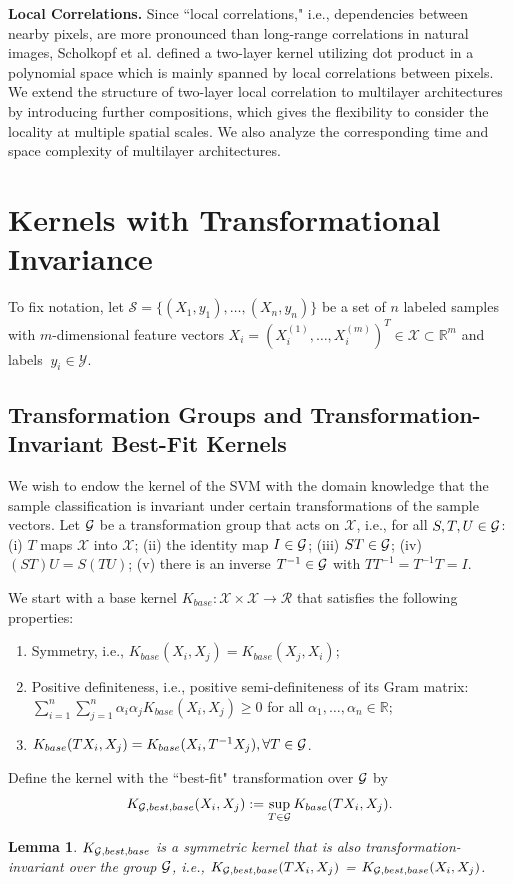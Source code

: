 \documentclass{article}
\theoremstyle{plain}
\newtheorem{lemma}{Lemma}
\theoremstyle{definition}
\theoremstyle{remark}
\begin{document}
\textbf{Local Correlations.}
Since ``local correlations," i.e., dependencies between nearby pixels, are more pronounced than long-range correlations in natural images, Scholkopf et al. \cite{scholkopf1998prior} defined a two-layer kernel utilizing dot product in a polynomial space which is mainly spanned by local correlations between pixels. We extend the structure of two-layer local correlation to multilayer architectures by introducing further compositions, which gives the flexibility to consider the locality at multiple spatial scales. We also analyze the corresponding time and space complexity of multilayer architectures. 



\section{Kernels with Transformational Invariance}
To fix notation, let  $\mathcal{S} = \{(X_1, y_1), \dots, (X_n, y_n)\}$ be a set of $n$ labeled samples with $m$-dimensional feature vectors $X_i = (X^{(1)}_i, \ldots, X^{(m)}_i)^T \in \mathcal{X} \subset \mathbb{R}^m$ and labels $\ y_i \in \mathcal{Y}$. 

\subsection{Transformation Groups and Transformation-Invariant Best-Fit Kernels} \label{sec:group-kernel}
We wish to endow the kernel of the SVM with the domain knowledge that the sample classification is invariant under certain transformations of the sample vectors. Let ${\cal{G}}$ be a transformation group that acts on $\mathcal{X}$, i.e., for all $S,T,U \in {\cal{G}}$: (i) $T$ maps $\mathcal{X}$ into $\mathcal{X}$; (ii) the identity map $I \in {\cal{G}}$; (iii) $ST \in {\cal{G}}$; (iv) $(ST)U = S(TU)$; (v) there is an inverse $T^{-1} \in {\cal{G}}$ with $T T^{-1} = T^{-1}T=I$.

We start with a base kernel $K_{base}: \mathcal{X} \times \mathcal{X} \to \mathcal{R}$ that satisfies the following properties:
\begin{enumerate}[itemsep=0mm]
\item 
Symmetry, i.e., $K_{base}(X_i,X_j)=K_{base}(X_j,X_i)$;
\item 
Positive definiteness, i.e., positive semi-definiteness of its Gram matrix: $\sum_{i=1}^n \sum_{j=1}^n \alpha_i \alpha_j K_{base}(X_i, X_j) \geq 0$ for all $\alpha_1, \dots, \alpha_n \in \mathbb{R}$;
\item 
$K_{base}(TX_i,X_j) = K_{base}(X_i, T^{-1}X_j), \forall T \in {\cal{G}}$.
\end{enumerate}
Define the kernel with the ``best-fit" transformation over ${\cal{G}}$ by
\begin{align}
    K_{{\cal{G}},best,base} (X_i, X_j) := \sup_{T \in {\cal{G}}} K_{base}(T X_i, X_j).
\end{align}
\begin{lemma}
    \label{lemma:sym}
    $K_{{\cal{G}},best,base}$ is a symmetric kernel that is also transformation-invariant over the group ${\cal{G}}$, i.e., 
    $K_{{\cal{G}},best,base} (TX_i, X_j)$ = $K_{{\cal{G}},best,base}(X_i, X_j) $.
\end{lemma} 
\end{document}
